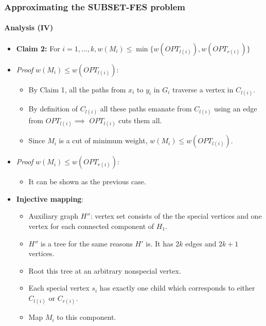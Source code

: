 \documentclass[10pt]{beamer}
\begin{document}
\begin{frame}
    \frametitle{Approximating the SUBSET-FES problem}
    \framesubtitle{Analysis (IV)}
    \begin{itemize}
        \item \textbf{Claim 2:} For \(i = 1, \ldots, k, w(M_i) \leq \min\{w(OPT_{l(i)}), w(OPT_{r(i)})\}\)
        \item \textit{Proof} \(w(M_i) \leq w(OPT_{l(i)})\):
        \begin{itemize}
            \item By Claim 1, all the paths from \(x_i\) to \(y_i\) in \(G_i\) traverse a vertex in \(C_{l(i)}\).
            \item By definition of \(C_{l(i)}\) all these paths emanate from \(C_{l(i)}\) using an edge from \(OPT_{l(i)} \implies\) \(OPT_{l(i)}\) cuts them all.
            \item Since \(M_i\) is a cut of minimum weight, \(w(M_i) \leq w(OPT_{l(i)})\).
        \end{itemize}
        \item \textit{Proof} \(w(M_i) \leq w(OPT_{r(i)})\):
        \begin{itemize}
            \item It can be shown as the previous case.
        \end{itemize}
        \item \textbf{Injective mapping}:
        \begin{itemize}
            \item Auxiliary graph \(H''\): vertex set consists of the the special vertices and one vertex for each connected component of \(H_1\).
            \item \(H''\) is a tree for the same reasons \(H'\) is. It has \(2k\) edges and \(2k + 1\) vertices.
            \item Root this tree at an arbitrary nonspecial vertex.
            \item Each special vertex \(s_i\) has exactly one child which corresponds to either \(C_{l(i)}\) or \(C_{r(i)}\).
            \item Map \(M_i\) to this component.
        \end{itemize}
    \end{itemize}
\end{frame}
\end{document}
